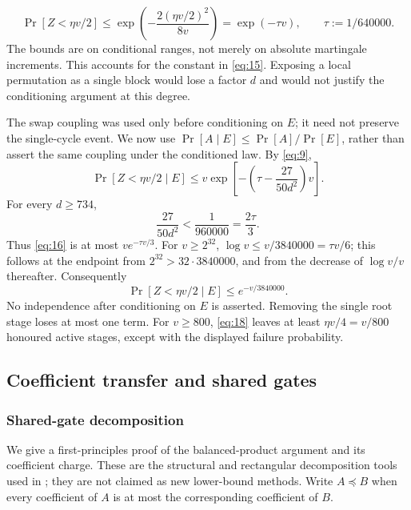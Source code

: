 \documentclass[11pt]{article}
\theoremstyle{definition}
\theoremstyle{remark}
\numberwithin{equation}{section}
\begin{document}
\begin{equation}\label{eq:15}
\Pr[Z<\eta v/2]
       \le\exp\left(-\frac{2(\eta v/2)^2}{8v}\right)
       =\exp(-\tau v),\qquad \tau:=1/640000.
\end{equation}
The bounds are on conditional ranges, not merely on absolute
martingale increments. This accounts for the constant in \eqref{eq:15}.
Exposing a local permutation as a single block would lose a factor
\(d\) and would not justify the conditioning argument at this degree.

The swap coupling was used only before conditioning on \(E\);
it need not preserve the single-cycle event. We now use
\(\Pr[A\mid E]\le\Pr[A]/\Pr[E]\), rather than assert the same
coupling under the conditioned law. By \eqref{eq:9},
\begin{equation}\label{eq:16}
\Pr[Z<\eta v/2\mid E]
       \le v\exp\left[-\left(\tau-\frac{27}{50d^2}\right)v\right].
\end{equation}
For every \(d\ge734\),
\begin{equation}\label{eq:17}
\frac{27}{50d^2}<\frac1{960000}
                                      =\frac{2\tau}{3}.
\end{equation}
Thus \eqref{eq:16} is at most \(v e^{-\tau v/3}\).
For \(v\ge2^{32}\), \(\log v\le v/3840000=\tau v/6\);
this follows at the endpoint from \(2^{32}>32\cdot3840000\),
and from the decrease of \(\log v/v\) thereafter. Consequently
\begin{equation}\label{eq:18}
\Pr[Z<\eta v/2\mid E]\le e^{-v/3840000}.
\end{equation}
No independence after conditioning on \(E\) is asserted.
Removing the single root stage loses at most one term. For
\(v\ge800\), \eqref{eq:18} leaves at least \(\eta v/4=v/800\)
honoured active stages, except with the displayed failure probability.

\subsection{Coefficient transfer and shared gates}\label{sub:transfer}
\subsubsection*{Shared-gate decomposition}
We give a first-principles proof of the balanced-product argument and
its coefficient charge. These are the structural and rectangular
decomposition tools used in \cite[Theorem~2 and Lemma~9]{CDGM2022};
they are not claimed as new lower-bound methods.
Write \(A\preceq B\) when every coefficient of \(A\) is at most the
corresponding coefficient of \(B\).
\end{document}
